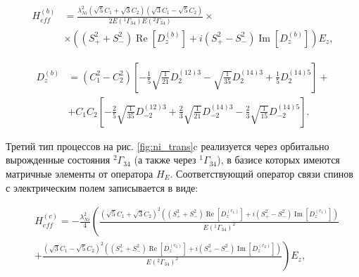 \begin{equation}
	\label{eq:NiHeffB}
	\begin{aligned}
		H_{eff}^{(b)} & =\frac{\lambda_{Ni}^{2}\left(\sqrt{5} C_{1}+\sqrt{3} 	C_{2}\right)\left(\sqrt{3} C_{1}-\sqrt{5} C_{2}\right)}{2 E\left({ }^{1} \Gamma_{34}\right) E\left({ }^{2} \Gamma_{34}\right)} \times \\
		& \times \left(\left(S_{+}^{2}+S_{-}^{2}\right) 	\operatorname{Re}\left[D_{z}^{(b)}\right]+i\left(S_{+}^{2}-S_{-}^{2}\right) \operatorname{Im}\left[D_{z}^{(b)}\right]\right) E_{z},
	\end{aligned}
\end{equation}

\begin{equation}
	\label{eq:NiDzB}
	\begin{aligned}
		D_{z}^{(b)} & =\left(C_{1}^{2}-C_{2}^{2}\right)\left[-\frac{1}{5} \sqrt{\frac{1}{21}} D_{2}^{(12) 3}-\sqrt{\frac{1}{35}} D_{2}^{(14) 3} +\frac{1}{5} D_{2}^{(14) 5}\right] + \\
		& + C_{1} C_{2}\left[-\frac{2}{5} \sqrt{\frac{1}{35}} D_{-2}^{(12) 3}+\frac{2}{3} \sqrt{\frac{1}{21}} D_{-2}^{(14) 3}-\frac{2}{3} \sqrt{\frac{1}{15}} D_{-2}^{(14) 5}\right].
	\end{aligned}
\end{equation}

Третий тип процессов на рис. \cref{fig:ni_trans}c реализуется через  орбитально вырожденные состояния $^{2}\Gamma_{34}$ (а также через  $^{1}\Gamma_{34}$), в базисе которых имеются матричные элементы от оператора $H_{E}$.  Соответствующий оператор связи спинов с электрическим полем записывается в виде:

\begin{equation}
	\label{eq:NiHeffC}
	\begin{aligned}
		& H_{eff}^{(c)}=  -\frac{\lambda_{Ni}^{2}}{4}\left(\frac{\left(\sqrt{5} C_{1}+\sqrt{3} C_{2}\right)^{2}\left(\left(S_{+}^{2}+S_{-}^{2}\right) \operatorname{Re}\left[D_{z}^{\left(c_{1}\right)}\right]+i\left(S_{+}^{2}-S_{-}^{2}\right) \operatorname{Im}\left[D_{z}^{\left(c_{1}\right)}\right]\right)}{E\left({ }^{1} \Gamma_{34}\right)^{2}}\right. \\
		& \left.+\frac{\left(\sqrt{3} C_{1}-\sqrt{5} C_{2}\right)^{2}\left(\left(S_{+}^{2}+S_{-}^{2}\right) \operatorname{Re}\left[D_{z}^{\left(c_{2}\right)}\right]+i\left(S_{+}^{2}-S_{-}^{2}\right) \operatorname{Im}\left[D_{z}^{\left(c_{2}\right)}\right]\right)}{E\left({ }^{2} \Gamma_{34}\right)^{2}}\right) E_{z},
	\end{aligned}
\end{equation}

